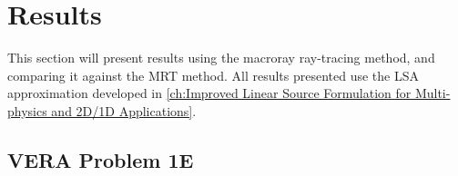 {  %



  \section{Results}{\label{sec:MR:Results}
    This section will present results using the macroray ray-tracing method, and comparing it against the \acf{MRT} method.
    All results presented use the \ac{LSA} approximation developed in \cref{ch:Improved Linear Source Formulation for Multi-physics and 2D/1D Applications}.

    \subsection{VERA Problem 1E}{\label{ssec:MR:VERA Problem 1E}

}}}
